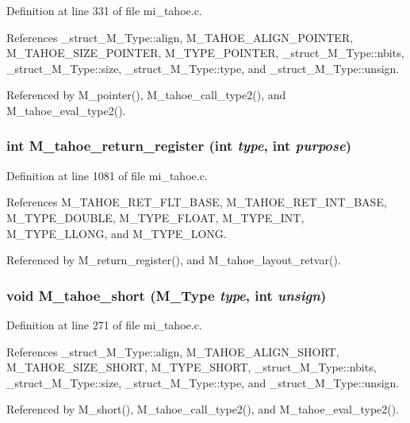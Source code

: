 Definition at line 331 of file mi\_\-tahoe.c.

References \_\-struct\_\-M\_\-Type::align, M\_\-TAHOE\_\-ALIGN\_\-POINTER, M\_\-TAHOE\_\-SIZE\_\-POINTER, M\_\-TYPE\_\-POINTER, \_\-struct\_\-M\_\-Type::nbits, \_\-struct\_\-M\_\-Type::size, \_\-struct\_\-M\_\-Type::type, and \_\-struct\_\-M\_\-Type::unsign.

Referenced by M\_\-pointer(), M\_\-tahoe\_\-call\_\-type2(), and M\_\-tahoe\_\-eval\_\-type2().
\subsubsection{\setlength{\rightskip}{0pt plus 5cm}int M\_\-tahoe\_\-return\_\-register (int {\em type}, int {\em purpose})}\label{mi__tahoe_8c_90c637e6c9975a5a0d566cd3b8033dbd}




Definition at line 1081 of file mi\_\-tahoe.c.

References M\_\-TAHOE\_\-RET\_\-FLT\_\-BASE, M\_\-TAHOE\_\-RET\_\-INT\_\-BASE, M\_\-TYPE\_\-DOUBLE, M\_\-TYPE\_\-FLOAT, M\_\-TYPE\_\-INT, M\_\-TYPE\_\-LLONG, and M\_\-TYPE\_\-LONG.

Referenced by M\_\-return\_\-register(), and M\_\-tahoe\_\-layout\_\-retvar().
\subsubsection{\setlength{\rightskip}{0pt plus 5cm}void M\_\-tahoe\_\-short (\bf{M\_\-Type} {\em type}, int {\em unsign})}\label{mi__tahoe_8c_956cdcd052d1c400b571918e4d4755c7}




Definition at line 271 of file mi\_\-tahoe.c.

References \_\-struct\_\-M\_\-Type::align, M\_\-TAHOE\_\-ALIGN\_\-SHORT, M\_\-TAHOE\_\-SIZE\_\-SHORT, M\_\-TYPE\_\-SHORT, \_\-struct\_\-M\_\-Type::nbits, \_\-struct\_\-M\_\-Type::size, \_\-struct\_\-M\_\-Type::type, and \_\-struct\_\-M\_\-Type::unsign.

Referenced by M\_\-short(), M\_\-tahoe\_\-call\_\-type2(), and M\_\-tahoe\_\-eval\_\-type2().
